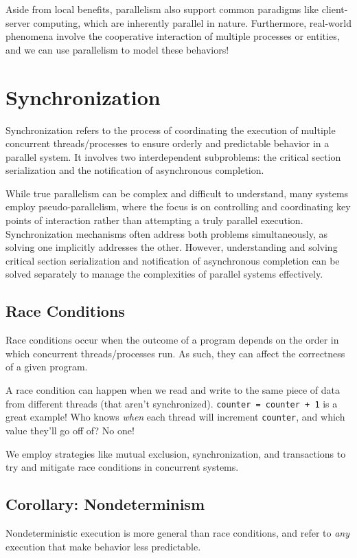 \documentclass{report}
\newcommand{\exampleBegin}[1]{\begin{tcolorbox}[colback=blue!5!white,colframe=black!75!blue,title={Example:
      #1}]}
\newcommand{\exampleEnd}{\end{tcolorbox}}
\begin{document}
Aside from local benefits, parallelism also support common paradigms like client-server computing,
which are inherently parallel in nature. Furthermore, real-world phenomena involve the cooperative
interaction of multiple processes or entities, and we can use parallelism to model these behaviors!





\chapter{Synchronization}
Synchronization refers to the process of coordinating the execution of multiple concurrent
threads/processes to ensure orderly and predictable behavior in a parallel system. It involves two
interdependent subproblems: the critical section serialization and the notification of asynchronous
completion.

While true parallelism can be complex and difficult to understand, many systems employ
pseudo-parallelism, where the focus is on controlling and coordinating key points of interaction
rather than attempting a truly parallel execution. Synchronization mechanisms often address both
problems simultaneously, as solving one implicitly addresses the other. However,
understanding and solving critical section serialization and notification of asynchronous completion
can be solved separately to manage the complexities of parallel systems effectively. 


\section{Race Conditions}
Race conditions occur when the outcome of a program depends on the order in which concurrent
threads/processes run. As such, they can affect the correctness of a given program.

\exampleBegin{No I Wrote First!}
A race condition can happen when we read and write to the same piece of data from different threads
(that aren't synchronized). \texttt{counter = counter + 1} is a great example! Who knows
\textit{when} each thread will increment \texttt{counter}, and which value they'll go off of? No one!
\exampleEnd

We employ strategies like mutual exclusion, synchronization, and transactions to try and mitigate
race conditions in concurrent systems.


\section*{Corollary: Nondeterminism}
Nondeterministic execution is more general than race conditions, and refer to \textit{any} execution
that make behavior less predictable.
\end{document}

